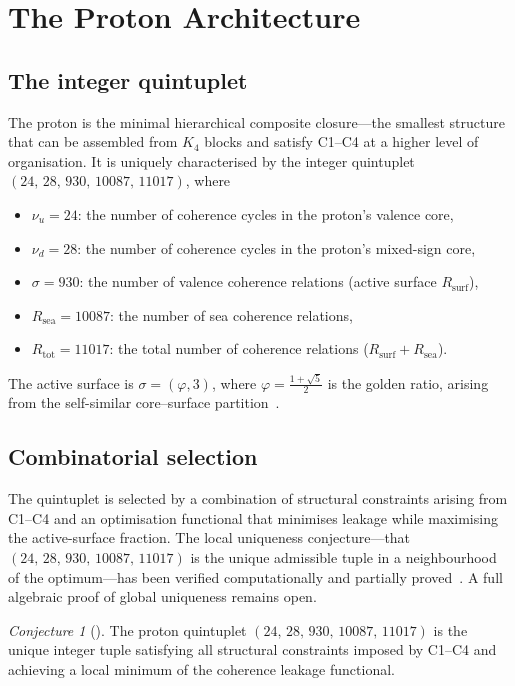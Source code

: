\documentclass[11pt,a4paper]{article}
\theoremstyle{plain}
\theoremstyle{definition}
\theoremstyle{remark}
\newtheorem{conjecture}[theorem]{Conjecture}
\newcommand{\quintuplet}{(24,\,28,\,930,\,10087,\,11017)}
\begin{document}
\section{The Proton Architecture}
\label{sec:proton}

\subsection{The integer quintuplet}
\label{subsec:quintuplet}
The proton is the minimal hierarchical composite closure---the smallest structure that can be assembled from $K_4$ blocks and satisfy C1--C4 at a higher level of organisation. It is uniquely characterised by the integer quintuplet $\quintuplet$, where
\begin{itemize}
\item $\nu_u = 24$: the number of coherence cycles in the proton's valence core,
\item $\nu_d = 28$: the number of coherence cycles in the proton's mixed-sign core,
\item $\sigma = 930$: the number of valence coherence relations (active surface $R_{\mathrm{surf}}$),
\item $R_{\mathrm{sea}} = 10087$: the number of sea coherence relations,
\item $R_{\mathrm{tot}} = 11017$: the total number of coherence relations ($R_{\mathrm{surf}}+R_{\mathrm{sea}}$).
\end{itemize}
The active surface is $\sigma=(\varphi,3)$, where $\varphi=\tfrac{1+\sqrt{5}}{2}$ is the golden ratio, arising from the self-similar core--surface partition~\cite{D05,D12}.

\subsection{Combinatorial selection}
\label{subsec:combinatorial}
The quintuplet is selected by a combination of structural constraints arising from C1--C4 and an optimisation functional that minimises leakage while maximising the active-surface fraction. The local uniqueness conjecture---that $\quintuplet$ is the unique admissible tuple in a neighbourhood of the optimum---has been verified computationally and partially proved~\cite{D16,D16b}. A full algebraic proof of global uniqueness remains open.

\begin{conjecture}[\cite{D16b}]
\label{conj:uniqueness}
The proton quintuplet $\quintuplet$ is the unique integer tuple satisfying all structural constraints imposed by C1--C4 and achieving a local minimum of the coherence leakage functional.
\end{conjecture}
\end{document}
